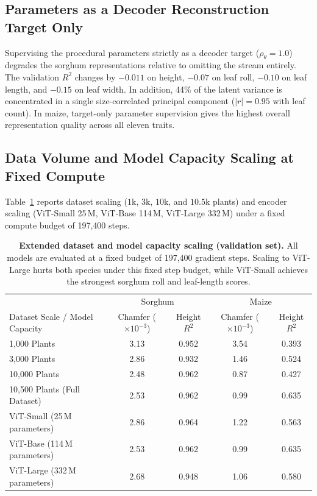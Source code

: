 \documentclass[10pt,twocolumn,letterpaper]{article}
\begin{document}
\subsection{Parameters as a Decoder Reconstruction Target Only}
Supervising the procedural parameters strictly as a decoder target ($\rho_\theta = 1.0$) degrades the sorghum representations relative to omitting the stream entirely. The validation $R^2$ changes by $-0.011$ on height, $-0.07$ on leaf roll, $-0.10$ on leaf length, and $-0.15$ on leaf width. In addition, 44\% of the latent variance is concentrated in a single size-correlated principal component ($|r| = 0.95$ with leaf count). In maize, target-only parameter supervision gives the highest overall representation quality across all eleven traits.

\subsection{Data Volume and Model Capacity Scaling at Fixed Compute}
Table~\ref{tab:supp-scaling} reports dataset scaling ($1$k, $3$k, $10$k, and $10.5$k plants) and encoder scaling (ViT-Small 25\,M, ViT-Base 114\,M, ViT-Large 332\,M) under a fixed compute budget of 197{,}400 steps.

\begin{table}[t]
  \caption{\textbf{Extended dataset and model capacity scaling (validation set).} All models are evaluated at a fixed budget of 197{,}400 gradient steps. Scaling to ViT-Large hurts both species under this fixed step budget, while ViT-Small achieves the strongest sorghum roll and leaf-length scores.}
  \label{tab:supp-scaling}
  \centering\small
  \begin{tabular}{lcccc}
  \toprule
   & \multicolumn{2}{c}{Sorghum} & \multicolumn{2}{c}{Maize} \\
  Dataset Scale / Model Capacity & Chamfer ($\times10^{-3}$) & Height $R^2$ & Chamfer ($\times10^{-3}$) & Height $R^2$ \\
  \midrule
  1{,}000 Plants & 3.13 & 0.952 & 3.54 & 0.393 \\
  3{,}000 Plants & 2.86 & 0.932 & 1.46 & 0.524 \\
  10{,}000 Plants & 2.48 & 0.962 & 0.87 & 0.427 \\
  10{,}500 Plants (Full Dataset) & 2.53 & 0.962 & 0.99 & 0.635 \\
  \midrule
  ViT-Small (25\,M parameters) & 2.86 & 0.964 & 1.22 & 0.563 \\
  ViT-Base (114\,M parameters) & 2.53 & 0.962 & 0.99 & 0.635 \\
  ViT-Large (332\,M parameters) & 2.68 & 0.948 & 1.06 & 0.580 \\
  \bottomrule
  \end{tabular}
\end{table}
\end{document}

